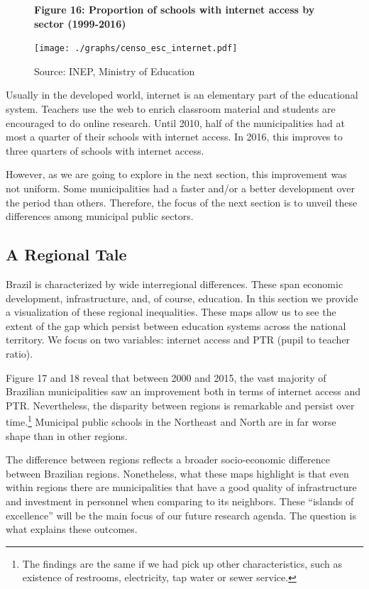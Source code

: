 \documentclass[12pt,]{article}
\let\rmarkdownfootnote\footnote%
\def\footnote{\protect\rmarkdownfootnote}
\begin{document}
\begin{figure}
    \centering
    \textbf{\small Figure 16: Proportion of schools with internet access by sector (1999-2016)}\par\medskip
    \texttt{[image: ./graphs/censo\_esc\_internet.pdf]}
    \caption*{\footnotesize \hfill Source: INEP, Ministry of Education}
\end{figure}

Usually in the developed world, internet is an elementary part of the
educational system. Teachers use the web to enrich classroom material
and students are encouraged to do online research. Until 2010, half of
the municipalities had at most a quarter of their schools with internet
access. In 2016, this improves to three quarters of schools with
internet access.

However, as we are going to explore in the next section, this
improvement was not uniform. Some municipalities had a faster and/or a
better development over the period than others. Therefore, the focus of
the next section is to unveil these differences among municipal public
sectors.

\subsection{A Regional Tale}

Brazil is characterized by wide interregional differences. These span
economic development, infrastructure, and, of course, education. In this
section we provide a visualization of these regional inequalities. These
maps allow us to see the extent of the gap which persist between
education systems across the national territory. We focus on two
variables: internet access and PTR (pupil to teacher ratio).

Figure 17 and 18 reveal that between 2000 and 2015, the vast majority of
Brazilian municipalities saw an improvement both in terms of internet
access and PTR. Nevertheless, the disparity between regions is
remarkable and persist over time.\footnote{The findings are the same if
  we had pick up other characteristics, such as existence of restrooms,
  electricity, tap water or sewer service.} Municipal public schools in
the Northeast and North are in far worse shape than in other regions.

The difference between regions reflects a broader socio-economic
difference between Brazilian regions. Nonetheless, what these maps
highlight is that even within regions there are municipalities that have
a good quality of infrastructure and investment in personnel when
comparing to its neighbors. These ``islands of excellence'' will be the
main focus of our future research agenda. The question is what explains
these outcomes.
\end{document}

